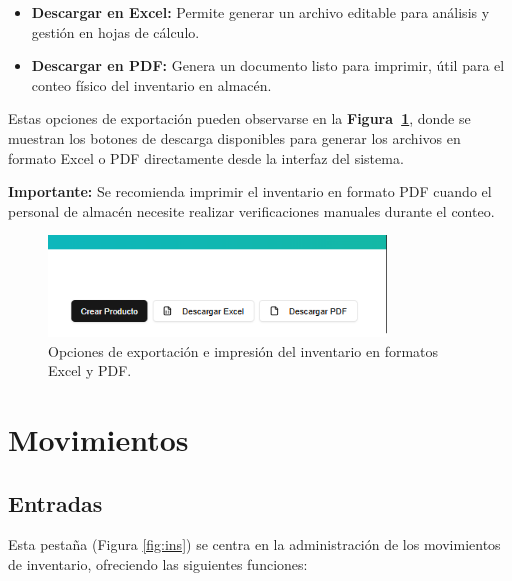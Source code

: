 \begin{itemize}
  \item \textbf{Descargar en Excel:} Permite generar un archivo editable para análisis y gestión en hojas de cálculo.
  \item \textbf{Descargar en PDF:} Genera un documento listo para imprimir, útil para el conteo físico del inventario en almacén.
\end{itemize}


\begin{justify}
Estas opciones de exportación pueden observarse en la \textbf{Figura~\ref{fig:exportarInventario}}, donde se muestran los botones de descarga disponibles para generar los archivos en formato Excel o PDF directamente desde la interfaz del sistema.
\end{justify}

\begin{justify}
\textbf{Importante:} Se recomienda imprimir el inventario en formato PDF cuando el personal de almacén necesite realizar verificaciones manuales durante el conteo.
\end{justify}

\begin{figure}[H]
\centering
\includegraphics[width=0.8\textwidth]{imgs/Almacen_General/inventario/inventario_pdf_excel_down.png}
\caption{Opciones de exportación e impresión del inventario en formatos Excel y PDF.}
\label{fig:exportarInventario}
\end{figure}




\section{Movimientos}

\subsection{Entradas}
Esta pestaña (Figura \ref{fig:ins}) se centra en la administración de los movimientos de inventario, ofreciendo las siguientes funciones: 

